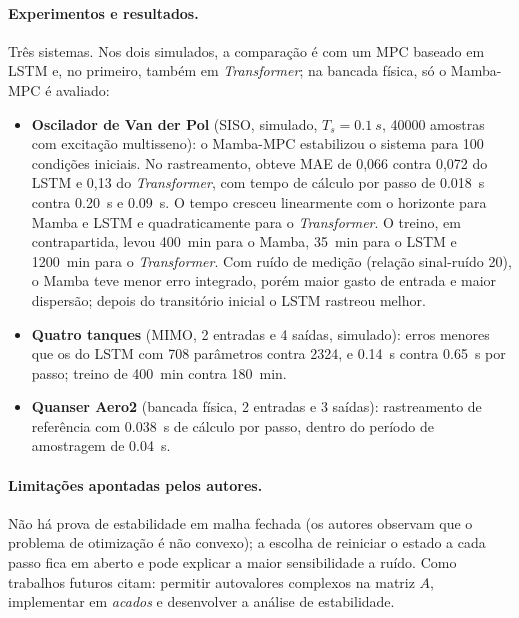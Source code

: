 \documentclass[11pt,a4paper]{article}
\begin{document}
\paragraph{Experimentos e resultados.} Três sistemas. Nos dois simulados, a comparação é com um MPC
baseado em LSTM e, no primeiro, também em \emph{Transformer}; na bancada física, só o Mamba-MPC é
avaliado:
\begin{itemize}\itemsep0pt
  \item \textbf{Oscilador de Van der Pol} (SISO, simulado, $T_s=\SI{0,1}{s}$, \num{40000} amostras
  com excitação multisseno): o Mamba-MPC estabilizou o sistema para 100 condições iniciais. No
  rastreamento, obteve MAE de 0,066 contra 0,072 do LSTM e 0,13 do \emph{Transformer}, com tempo
  de cálculo por passo de \SI{0,018}{s} contra \SI{0,20}{s} e \SI{0,09}{s}. O tempo cresceu
  linearmente com o horizonte para Mamba e LSTM e quadraticamente para o \emph{Transformer}. O
treino, em contrapartida, levou \SI{400}{min} para o Mamba, \SI{35}{min} para o LSTM e
\SI{1200}{min} para o \emph{Transformer}. Com
  ruído de medição (relação sinal-ruído 20), o Mamba teve menor erro integrado, porém maior gasto
  de entrada e maior dispersão; depois do transitório inicial o LSTM rastreou melhor.
  \item \textbf{Quatro tanques} (MIMO, 2 entradas e 4 saídas, simulado): erros menores que os do
  LSTM com 708 parâmetros contra \num{2324}, e \SI{0,14}{s} contra \SI{0,65}{s} por passo; treino de
\SI{400}{min} contra \SI{180}{min}.
  \item \textbf{Quanser Aero2} (bancada física, 2 entradas e 3 saídas): rastreamento de referência
  com \SI{0,038}{s} de cálculo por passo, dentro do período de amostragem de \SI{0,04}{s}.
\end{itemize}

\paragraph{Limitações apontadas pelos autores.} Não há prova de estabilidade em malha fechada (os
autores observam que o problema de otimização é não convexo); a escolha de reiniciar o estado a cada passo fica em aberto e
pode explicar a maior sensibilidade a ruído. Como trabalhos futuros citam: permitir autovalores
complexos na matriz $A$, implementar em \emph{acados} e desenvolver a análise de estabilidade.
\end{document}
